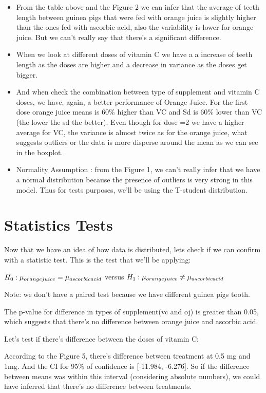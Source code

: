 \documentclass[]{article}
\begin{document}
\begin{itemize}
\item
  From the table above and the Figure 2 we can infer that the average of
  teeth length between guinea pigs that were fed with orange juice is
  slightly higher than the ones fed with ascorbic acid, also the
  variability is lower for orange juice. But we can't really say that
  there's a significant difference.
\item
  When we look at different doses of vitamin C we have a a increase of
  teeth length as the doses are higher and a decrease in variance as the
  doses get bigger.
\item
  And when check the combination between type of supplement and vitamin
  C doses, we have, again, a better performance of Orange Juice. For the
  first dose orange juice means is 60\% higher than VC and Sd is 60\%
  lower than VC (the lower the sd the better). Even though for dose =2
  we have a higher average for VC, the variance is almost twice as for
  the orange juice, what suggests outliers or the data is more disperse
  around the mean as we can see in the boxplot.
\item
  Normality Assumption : from the Figure 1, we can't really infer that
  we have a normal distribution because the presence of outliers is very
  strong in this model. Thus for tests purposes, we'll be using the
  T-student distribution.
\end{itemize}

\section{Statistics Tests}\label{statistics-tests}

Now that we have an idea of how data is distributed, lets check if we
can confirm with a statistic test. This is the test that we'll be
applying:

\def\oj{\rule{0pt}{1.0ex}orangejuice}
\def\vc{\rule{0pt}{1.0ex}ascorbicacid} \(H_{0}: \mu_{\oj} = \mu_{\vc}\)
versus \(H_{1}: \mu_{\oj} \neq \mu_{\vc}\)

Note: we don't have a paired test because we have different guinea pigs
tooth.

The p-value for difference in types of supplement(vc and oj) is greater
than 0.05, which suggests that there's no difference between orange
juice and ascorbic acid.

Let's test if there's difference between the doses of vitamin C:

According to the Figure 5, there's difference between treatment at 0.5
mg and 1mg. And the CI for 95\% of confidence is {[}-11.984, -6.276{]}.
So if the difference between means was within this interval (considering
absolute numbers), we could have inferred that there's no difference
between treatments.
\end{document}

